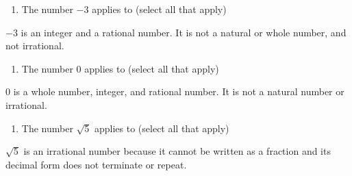 \documentclass{ximera}
\begin{document}
\begin{problem}
\begin{enumerate}
\item The number $-3$ applies to (select all that apply)
\begin{selectAll}
\end{selectAll}
\end{enumerate}

\begin{feedback}
$-3$ is an integer and a rational number. It is not a natural or whole number, and not irrational.
\end{feedback}
\end{problem}

\begin{problem}
\begin{enumerate}
\item The number $0$ applies to (select all that apply)
\begin{selectAll}
\end{selectAll}
\end{enumerate}

\begin{feedback}
$0$ is a whole number, integer, and rational number. It is not a natural number or irrational.
\end{feedback}
\end{problem}

\begin{problem}
\begin{enumerate}
\item The number $\sqrt{5}$ applies to (select all that apply)
\begin{selectAll}
\end{selectAll}
\end{enumerate}

\begin{feedback}
$\sqrt{5}$ is an irrational number because it cannot be written as a fraction and its decimal form does not terminate or repeat.
\end{feedback}
\end{problem}
\end{document}
